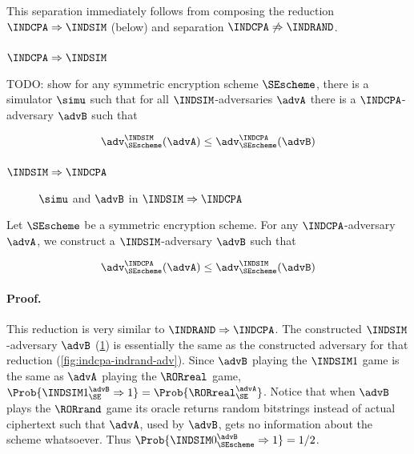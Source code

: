 This separation immediately follows from composing the reduction
$\INDCPA \Rightarrow \INDSIM$ (below) and separation
$\INDCPA \not\Rightarrow \INDRAND$.

\subsubsection*{$\INDCPA \Rightarrow \INDSIM$}

TODO: show for any symmetric encryption scheme $\SEscheme$, there is
a simulator $\simu$ such that for all $\INDSIM$-adversaries $\advA$ there is
a $\INDCPA$-adversary $\advB$ such that 

$$
\adv_{\SEscheme}^{\INDSIM}(\advA) \leq \adv_{\SEscheme}^{\INDCPA}(\advB)
$$

\subsubsection*{$\INDSIM \Rightarrow \INDCPA$}

\begin{figure}[p]
	\centering
  \caption{$\simu$ and $\advB$ in $\INDSIM \Rightarrow \INDCPA$}
  \label{fig:indsim-indrand-reduct}
\end{figure}

Let $\SEscheme$ be a symmetric encryption scheme. For any $\INDCPA$-adversary
$\advA$, we construct a $\INDSIM$-adversary $\advB$ such that

$$
\adv_{\SEscheme}^{\INDCPA}(\advA) \leq \adv_{\SEscheme}^{\INDSIM}(\advB)
$$

\paragraph{Proof.}

This reduction is very similar to $\INDRAND \Rightarrow \INDCPA$.
The constructed $\INDSIM$-adversary $\advB$ (\cref{fig:indsim-indrand-reduct})
is essentially the same as the constructed adversary for that reduction
(\cref{fig:indcpa-indrand-adv}). Since $\advB$ playing the $\INDSIM1$ game
is the same as $\advA$ playing the $\RORreal$ game,
$\Prob{\INDSIM1_{\SE}^{\advB} \Rightarrow 1} = \Prob{\RORreal_{\SE}^{\advA}}$.
Notice that when $\advB$ plays the $\RORrand$ game its oracle returns
random bitstrings instead of actual ciphertext such that $\advA$, used by
$\advB$, gets no information about the scheme whatsoever. Thus
$\Prob{\INDSIM0_{\SEscheme}^{\advB} \Rightarrow 1} = 1/2$.

